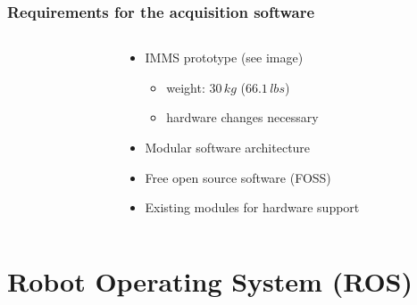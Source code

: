 \documentclass[aspectratio=169]{beamer}
\begin{document}
  \begin{frame}
   \frametitle{Requirements for the acquisition software}
   \begin{columns}[onlytextwidth]
    \begin{column}{0.5\textwidth}
    
    
    \end{column}
    \begin{column}{0.5\textwidth}
      \begin{itemize}
       \item IMMS prototype (see image) %
       \begin{itemize}
	\item weight: $30\,kg$ ($66.1\, lbs$)
	\item hardware changes necessary
       \end{itemize}
       \pause
       \item Modular software architecture
       \item Free open source software (FOSS)
       \item Existing modules for hardware support
      \end{itemize}
    \end{column}
   \end{columns}
  \end{frame}

\section{Robot Operating System (ROS)}
\end{document}
